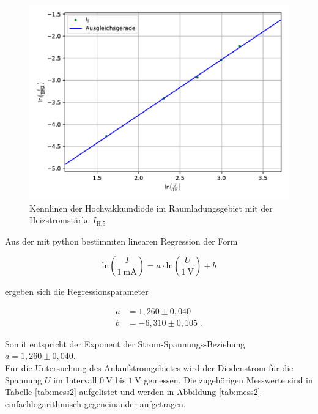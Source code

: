 \begin{figure} [H]
  \centering
  \includegraphics{content/plot2.pdf}
  \caption{Kennlinen der Hochvakkumdiode im Raumladungsgebiet mit der Heizstromstärke $I_\text{H,5}$}
  \label{fig:plot2}
\end{figure}

Aus der mit python bestimmten linearen Regression der Form 

\begin{equation*}
    \text{ln} \left(\frac{I}{\SI{1}{\milli\ampere}} \right) 
    = a \cdot \text{ln} \left(\frac{U}{\SI{1}{\volt}} \right) + b
\end{equation*}

ergeben sich die Regressionsparameter 

\begin{align*}
    a &= 1,260  \pm 0,040 \\
    b &= -6,310 \pm 0,105 \; .
\end{align*}

Somit entspricht der Exponent der Strom-Spannungs-Beziehung $a = 1,260  \pm 0,040$.\\

Für die Untersuchung des Anlaufstromgebietes wird der Diodenstrom für die Spannung $U$ im 
Intervall $\SI{0}{\volt}$ bis $\SI{1}{\volt}$ gemessen. Die zugehörigen Messwerte sind in 
Tabelle \ref{tab:mess2} aufgelistet und werden in Abbildung \ref{tab:mess2}
einfachlogarithmisch gegeneinander aufgetragen.

